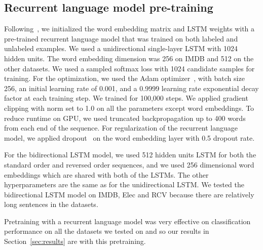 \documentclass{article}
\begin{document}
\subsection{Recurrent language model pre-training}
Following~\citet{dai2015semi}, we initialized the word embedding 
matrix and LSTM weights with a pre-trained recurrent language model
\cite[]{bengio2006neural, mikolov2010recurrent} that was trained on both labeled and unlabeled
examples.
We used a unidirectional single-layer LSTM with 1024 hidden units.
The word embedding dimension  was 256 on IMDB and 512 on the other datasets. 
We used a sampled softmax loss with 1024 candidate samples for training. 
For the optimization, we used the Adam optimizer~\cite[]{kingma2014adam},
with batch size 256, an initial learning rate of 0.001, and a 0.9999 learning rate
exponential decay factor at each training step.
We trained for 100,000 steps. 
We applied gradient clipping with norm set to 1.0 on all the parameters except word embeddings.
To reduce runtime on GPU, we used truncated backpropagation up to 400 words
 from each end of the sequence. 
For regularization of the recurrent language model, we applied dropout~\cite[]{srivastava2014dropout} 
on the word embedding layer with 0.5 dropout rate.

For the bidirectional LSTM model, we used 512 hidden units LSTM for both the standard
order and reversed order sequences, and we used 256 dimensional word embeddings
which are shared with both of the LSTMs. The other hyperparameters are the same as for the unidirectional LSTM.
We tested the bidirectional LSTM model on IMDB, Elec and RCV because there are relatively long sentences
in the datasets.
 
Pretraining with a recurrent language model was very effective on classification
performance on all the datasets we tested on and so our results in
Section~\ref{sec:results} are with this pretraining.
\end{document}
